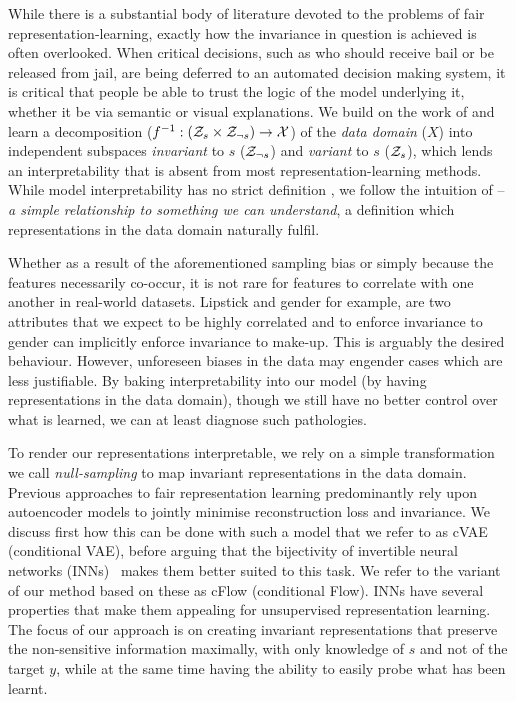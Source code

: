 While there is a substantial body of literature devoted to the problems of fair
representation-learning, exactly how the invariance in question is achieved is often overlooked.
%
When critical decisions, such as who should receive bail or be released from jail, are being
deferred to an automated decision making system, it is critical that people be able to trust the
logic of the model underlying it, whether it be via semantic or visual explanations. 
%
We build on the work of \citet{QuaShaTho19} and learn a decomposition ($f^{-1}: ({\mathcal{Z}}_s \times
{\mathcal{Z}}_{\neg s}) \to {\mathcal{X}}$) of the \emph{data domain} ($X$) into independent subspaces
\emph{invariant} to  $s$ (${\mathcal{Z}}_{\neg s}$) and \emph{variant} to $s$ (${\mathcal{Z}}_{s}$), which lends an
interpretability that is absent from most representation-learning methods. 
%
While model interpretability has no strict definition \citep{zhang2018visual}, we follow the
intuition of \citet{adel2018discovering} -- \emph{a simple relationship to something we can
understand}, a definition which representations in the data domain naturally fulfil.

Whether as a result of the aforementioned sampling bias or simply because the features necessarily
co-occur, it is not rare for features to correlate with one another in real-world datasets.
%
Lipstick and gender for example, are two attributes that we expect to be highly correlated and to
enforce invariance to gender can implicitly enforce invariance to make-up. 
%
This is arguably the desired behaviour. 
%
However, unforeseen biases in the data may engender cases which are less justifiable. 
%
By baking interpretability into our model (by having representations in the data domain), though we
still have no better control over what is learned, we can at least diagnose such pathologies.

To render our representations interpretable, we rely on a simple transformation we call
\emph{null-sampling} to map invariant representations in the data domain. Previous approaches to
fair representation learning
\citep{beutel2017data,edwards2016censoring,madras2018learning,louizos2016variational} predominantly
rely upon autoencoder models to jointly minimise reconstruction loss and invariance. 
%
We discuss first how this can be done with such a model that we refer to as cVAE (conditional VAE),
before arguing that the bijectivity of invertible neural networks (INNs)~\citep{Dinh2014} makes
them better suited to this task. 
%
We refer to the variant of our method based on these as cFlow (conditional Flow). 
%
INNs have several properties that make them appealing for unsupervised representation learning. 
%
The focus of our approach is on creating invariant representations that preserve the non-sensitive
information maximally, with only knowledge of $s$ and not of the target $y$, while at the same time
having the ability to easily probe what has been learnt.

